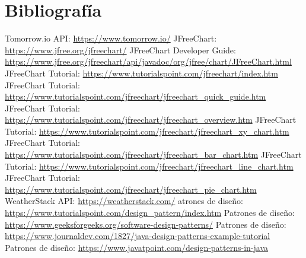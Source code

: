 \documentclass{article}
\begin{document}
\section{Bibliografía}
\begin{thebibliography}{99}
    \bibitem Tomorrow.io API: \url{https://www.tomorrow.io/}
    \bibitem JFreeChart: \url{https://www.jfree.org/jfreechart/}
    \bibitem JFreeChart Developer Guide: \url{https://www.jfree.org/jfreechart/api/javadoc/org/jfree/chart/JFreeChart.html}
    \bibitem JFreeChart Tutorial: \url{https://www.tutorialspoint.com/jfreechart/index.htm}
    \bibitem JFreeChart Tutorial: \url{https://www.tutorialspoint.com/jfreechart/jfreechart_quick_guide.htm}
    \bibitem JFreeChart Tutorial: \url{https://www.tutorialspoint.com/jfreechart/jfreechart_overview.htm}
    \bibitem JFreeChart Tutorial: \url{https://www.tutorialspoint.com/jfreechart/jfreechart_xy_chart.htm}
    \bibitem JFreeChart Tutorial: \url{https://www.tutorialspoint.com/jfreechart/jfreechart_bar_chart.htm}
    \bibitem JFreeChart Tutorial: \url{https://www.tutorialspoint.com/jfreechart/jfreechart_line_chart.htm}
    \bibitem JFreeChart Tutorial: \url{https://www.tutorialspoint.com/jfreechart/jfreechart_pie_chart.htm}
    \bibitem WeatherStack API: \url{https://weatherstack.com/}
    \bibitem atrones de diseño: \url{https://www.tutorialspoint.com/design_pattern/index.htm}
    \bibitem Patrones de diseño: \url{https://www.geeksforgeeks.org/software-design-patterns/}
    \bibitem Patrones de diseño: \url{https://www.journaldev.com/1827/java-design-patterns-example-tutorial}
    \bibitem Patrones de diseño: \url{https://www.javatpoint.com/design-patterns-in-java}
\end{thebibliography}
\end{document}
